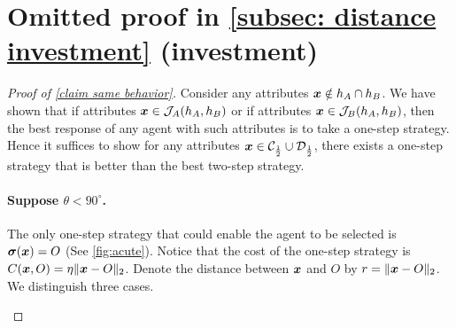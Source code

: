\section{Omitted proof in  \cref{subsec: distance investment} 
 (investment)}\label{appendix: distance investment}


\begin{proof}[Proof of \cref{claim same behavior}]
    Consider any attributes $\boldsymbol{x}\notin h_A\cap h_B$. 
    We have shown that 
    if attributes $\boldsymbol{x} \in \mathcal{J}_A(h_A,h_B)$ or if attributes $\boldsymbol{x} \in \mathcal{J}_B(h_A,h_B)$, then the best response of any agent with such attributes is to take a one-step strategy.
    Hence it suffices to show for any attributes $\boldsymbol{x} \in \mathcal{C}_{\frac12}\cup\mathcal{D}_{\frac12}$, there exists a one-step strategy  that is better than the best two-step strategy.

    \paragraph{Suppose  $\theta< 90^{\circ}$.}  The only  one-step strategy that could enable the agent to be selected is $\boldsymbol{\sigma}(\boldsymbol{x})=O$ (See \cref{fig:acute}).
    Notice that the cost of the one-step strategy is $C(\boldsymbol{x},O)=\eta \|\boldsymbol{x} - O\|_2$.
    Denote the distance between $\boldsymbol{x}$ and $O$ by $r= \|\boldsymbol{x} - O\|_2$.
    We distinguish three cases. 
    
    \begin{figure}
    \centering
\end{figure}
\end{proof}
